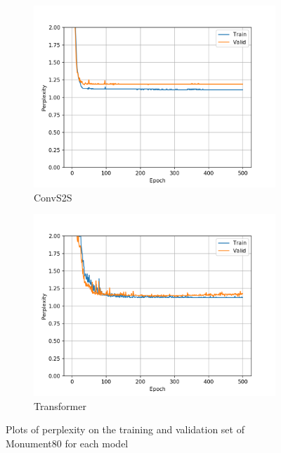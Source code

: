\begin{figure}[H]
\begin{subfigure}{0.45\textwidth}
\includegraphics[width=\textwidth]{../results/monument2_1/run2/fconv_wmt_en_de/ppls.png} 
\caption{ConvS2S}
\label{fig:monu1 convs2s ppl}
\end{subfigure}
\hfill
\begin{subfigure}{0.45\textwidth}
\includegraphics[width=\textwidth]{../results/monument2_1/run1/transformer_iwslt_de_en/ppls.png}
\caption{Transformer}
\label{fig:monu1 transformer ppl}
\end{subfigure}
\hfill
\caption{Plots of perplexity on the training and validation set of Monument80 for each model}
\label{fig:monu1 ppls}
\end{figure}

